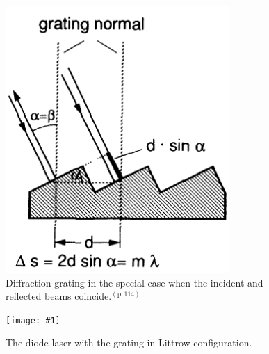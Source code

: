 \documentclass[twocolumn]{article}
\newcommand{\insertFigure}[1]{%
   \texttt{[image: \#1]}%
}
\begin{document}
\begin{figure}
	\centering
	\includegraphics[scale=0.3]{Images/Grating.png}
	\caption{Diffraction grating in the special case when the incident and reflected beams coincide.\cite{demtroder}$^{(\text{p.}\, 114)}$}
	\label{fig:Grating}
\end{figure}
\begin{figure} [!h]
	\centering
	\insertFigure{Images/Diode.png}
	\caption{The diode laser with the grating in Littrow configuration.\cite{manual}}
	\label{fig:Diode}
\end{figure}
\end{document}
